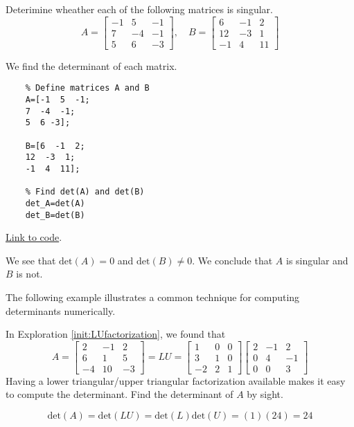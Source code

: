 \documentclass{ximera}
\begin{document}
\begin{example}\label{ex_oct_det_singular}
  Deterimine wheather each of the following matrices is singular.
  $$A=\begin{bmatrix}-1 & 5 & -1\\7 & -4 & -1\\5 & 6 & -3\end{bmatrix},\quad B=\begin{bmatrix}6 & -1 & 2\\12 & -3 & 1\\-1 & 4 & 11\end{bmatrix}$$
  \begin{explanation}
  We find the determinant of each matrix.
  \begin{verbatim}
    % Define matrices A and B
    A=[-1  5  -1;
    7  -4  -1;
    5  6 -3];

    B=[6  -1  2;
    12  -3  1;
    -1  4  11];

    % Find det(A) and det(B)
    det_A=det(A)
    det_B=det(B)
  \end{verbatim}

\href{https://sagecell.sagemath.org/?z=eJwtjbsKgDAMRfdC_-Eugg4d4nOQDi3iT4iIaIUOOmj_H1PrlHMfSTIM7vCXw7mG22_ugcF67bBSGD0pAhpAUS9Fx7P-mb0WqpoZpbB6aqMPlKypZK6AWIserxClYobR8-ndhdwU35eItpCC52J0CpKyOmUvBfgj9w==&lang=octave&interacts=eJyLjgUAARUAuQ==}{Link to code}.

We see that $\text{det}(A)=0$ and $\text{det}(B)\neq 0$.  We conclude that $A$ is singular and $B$ is not.

  \end{explanation}
\end{example}

The following example illustrates a common technique for computing determinants numerically.
\begin{example}\label{ex_oct_det_LU}
  In Exploration \ref{init:LUfactorization}, we found that
  $$A=\begin{bmatrix}2&-1&2\\6&1&5\\-4&10&-3\end{bmatrix}=LU=\begin{bmatrix}1&0&0\\3&1&0\\-2&2&1\end{bmatrix}\begin{bmatrix}2&-1&2\\0&4&-1\\0&0&3\end{bmatrix}$$
  Having a lower triangular/upper triangular factorization available makes it easy to compute the determinant. Find the determinant of $A$ by sight.
  \begin{explanation}
    $$\text{det}(A)=\text{det}(LU)=\text{det}(L)\text{det}(U)=(1)(24)=24$$
  \end{explanation} 
\end{example}
\end{document}
